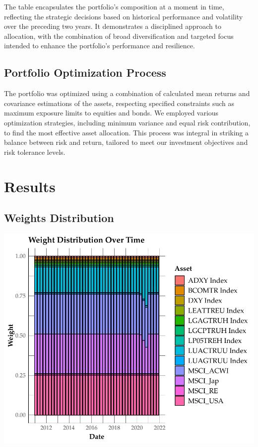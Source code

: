 \documentclass[11pt,preprint, authoryear]{elsarticle}
\numberwithin{equation}{section}
\numberwithin{figure}{section}
\numberwithin{table}{section}
\begin{document}
The table encapsulates the portfolio's composition at a moment in time,
reflecting the strategic decisions based on historical performance and
volatility over the preceding two years. It demonstrates a disciplined
approach to allocation, with the combination of broad diversification
and targeted focus intended to enhance the portfolio's performance and
resilience.

\hypertarget{portfolio-optimization-process}{%
\subsection{Portfolio Optimization
Process}\label{portfolio-optimization-process}}

The portfolio was optimized using a combination of calculated mean
returns and covariance estimations of the assets, respecting specified
constraints such as maximum exposure limits to equities and bonds. We
employed various optimization strategies, including minimum variance and
equal risk contribution, to find the most effective asset allocation.
This process was integral in striking a balance between risk and return,
tailored to meet our investment objectives and risk tolerance levels.

\hypertarget{results}{%
\section{Results}\label{results}}

\hypertarget{weights-distribution}{%
\subsection{Weights Distribution}\label{weights-distribution}}

\includegraphics{Question-6_files/figure-latex/stacked-bar-1.pdf}
\end{document}
